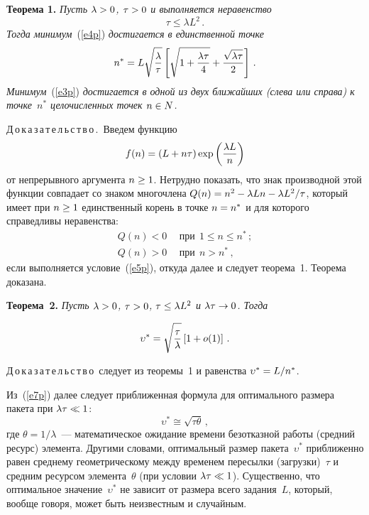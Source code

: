 \begin{multicols}{2}
     \medskip
     
     \noindent
     \textbf{Теорема 1.} \textit{Пусть $\lambda\hm>0$, $\tau\hm>0$ и 
выполняется неравенство}
     \begin{equation}
     \tau\leq \lambda L^2\,.
     \label{e5p}
     \end{equation}
\textit{Тогда минимум}~(\ref{e4p}) \textit{достигается в единственной \mbox{точке}}
$$
n^*=L\sqrt{\displaystyle\frac{\displaystyle \lambda\mathstrut}{\displaystyle \tau\mathstrut}}\left[  
\sqrt{1+\displaystyle\frac{\displaystyle \lambda\tau\mathstrut}{\displaystyle 4\mathstrut}}+\displaystyle\frac{\displaystyle \sqrt{\lambda\tau}\mathstrut}{\displaystyle 2\mathstrut}\right]\,.
$$
\textit{Минимум}~(\ref{e3p}) \textit{достигается в одной из двух ближайших 
(слева или справа) к точке~$n^*$ целочисленных точек $n\hm\in N$.} 

     \smallskip
     
     \noindent
     Д\,о\,к\,а\,з\,а\,т\,е\,л\,ь\,с\,т\,в\,о\,.\ Введем функцию
     \begin{equation}
     f(n) =\left( L+n\tau\right) \exp\left( \displaystyle\frac{\displaystyle \lambda L\mathstrut}{\displaystyle n\mathstrut}\right)
     \label{e6p}
     \end{equation}
от непрерывного аргумента $n\hm\geq 1$. Нетрудно показать, что знак 
производной этой функции совпадает со знаком многочлена 
$Q(n)\hm=n^2\hm-\lambda L n -\lambda L^2/\tau$, который имеет при 
$n\hm\geq 1$ единственный корень в точке $n\hm=n^*$ и для которого 
справедливы неравенства:
\begin{align*}
Q(n)<0 &\ \ \mbox{при}\ \ 1\leq n\leq n^*\,;\\
Q(n)>0 &\  \ \mbox{при}\ \ n>n^*\,,
\end{align*}
если выполняется условие~(\ref{e5p}), откуда далее и следует теорема~1. 
Теорема доказана.

\smallskip

     \noindent
     \textbf{Теорема~2.} \textit{Пусть $\lambda\hm>0$, $\tau\hm>0$, 
$\tau\hm\leq \lambda L^2$ и $\lambda\tau\hm\rightarrow 0$. Тогда} 

\noindent
     \begin{equation}
     \upsilon^*=\sqrt{\displaystyle\frac{\displaystyle \tau\mathstrut}{\displaystyle \lambda\mathstrut}}\left[ 1+o(1)\right]\,.
     \label{e7p}
     \end{equation}
     
     \smallskip
     
     \noindent
     Д\,о\,к\,а\,з\,а\,т\,е\,л\,ь\,с\,т\,в\,о\ следует из теоремы~1 и равенства 
$\upsilon^*\hm=L/n^*$. 
     
     \medskip
     
     Из~(\ref{e7p}) далее следует приближенная формула для оптимального 
размера пакета при $\lambda\tau\hm\ll 1$:
     $$
     \upsilon^*\cong \sqrt{\tau\theta}\,,
     $$
где $\theta=1/\lambda$~--- математическое ожидание \mbox{времени} безотказной 
работы (средний ресурс) элемента. Другими словами, оптимальный размер 
пакета~$\upsilon^*$ приближенно равен среднему геометрическому между 
временем пересылки (загрузки)~$\tau$ и средним ресурсом элемента~$\theta$ 
(при условии $\lambda\tau\hm\ll 1$). Существенно, что оптимальное 
значение~$\upsilon^*$ не зависит от размера всего задания~$L$, который, 
вообще говоря, может быть неизвестным и случайным.
     

\end{multicols}
